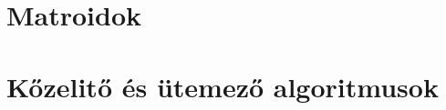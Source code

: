 \documentclass[a4paper,12pt,oneside,openright]{report}
\begin{document}


\tableofcontents
%
%
%
%
%
%
%
\chapter{Matroidok}
%
%
%
%
%


\chapter{Kőzelitő és ütemező algoritmusok}

\end{document}
